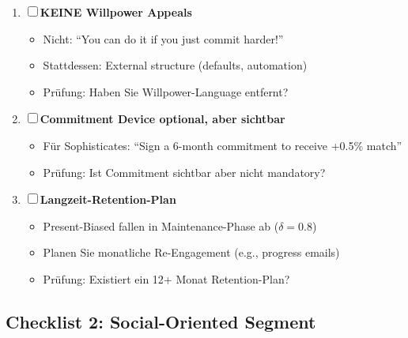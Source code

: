 \begin{tcolorbox}[colback=blue!5!white, colframe=blue!75!black, title=\textbf{Deployment Checklist: Present-Biased}]
\begin{enumerate}[label=\textbf{PB-\arabic*}]
\item ☐ \textbf{KEINE Willpower Appeals}
  \begin{itemize}[nosep]
  \item Nicht: ``You can do it if you just commit harder!''
  \item Stattdessen: External structure (defaults, automation)
  \item Prüfung: Haben Sie Willpower-Language entfernt?
  \end{itemize}

\item ☐ \textbf{Commitment Device optional, aber sichtbar}
  \begin{itemize}[nosep]
  \item Für Sophisticates: ``Sign a 6-month commitment to receive +0.5\% match''
  \item Prüfung: Ist Commitment sichtbar aber nicht mandatory?
  \end{itemize}

\item ☐ \textbf{Langzeit-Retention-Plan}
  \begin{itemize}[nosep]
  \item Present-Biased fallen in Maintenance-Phase ab ($\delta = 0.8$)
  \item Planen Sie monatliche Re-Engagement (e.g., progress emails)
  \item Prüfung: Existiert ein 12+ Monat Retention-Plan?
  \end{itemize}
\end{enumerate}

\end{tcolorbox}

\subsection{Checklist 2: Social-Oriented Segment}

